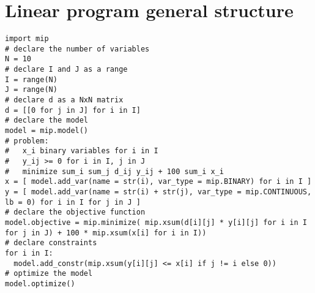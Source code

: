\section{Linear program general structure}
\begin{lstlisting}[style=Python]
import mip
# declare the number of variables
N = 10
# declare I and J as a range
I = range(N)
J = range(N)
# declare d as a NxN matrix
d = [[0 for j in J] for i in I]
# declare the model
model = mip.model()
# problem:
#   x_i binary variables for i in I
#   y_ij >= 0 for i in I, j in J
#   minimize sum_i sum_j d_ij y_ij + 100 sum_i x_i
x = [ model.add_var(name = str(i), var_type = mip.BINARY) for i in I ]
y = [ model.add_var(name = str(i) + str(j), var_type = mip.CONTINUOUS, lb = 0) for i in I for j in J ]
# declare the objective function
model.objective = mip.minimize( mip.xsum(d[i][j] * y[i][j] for i in I for j in J) + 100 * mip.xsum(x[i] for i in I))
# declare constraints
for i in I:
  model.add_constr(mip.xsum(y[i][j] <= x[i] if j != i else 0))
# optimize the model
model.optimize()
\end{lstlisting}
\newpage